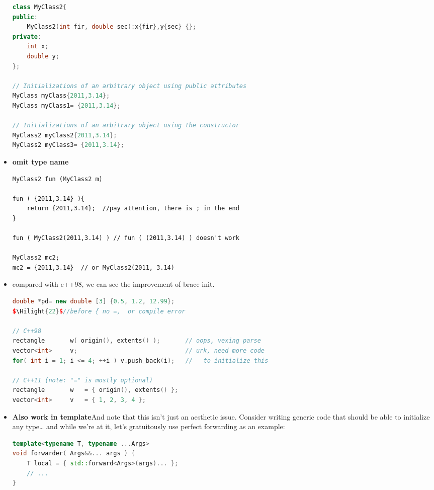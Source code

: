 \documentclass[a4paper,11pt,twoside]{book}
\newcommand{\Hilight}[1]{\makebox[0pt][l]{\color{yellow}\rule[-3pt]{#1em}{11pt}}}
\newcommand{\Hilight}[1]{}
\begin{document}
\begin{itemize}
\begin{lstlisting}[frame=single, language=c++,mathescape=true]
class MyClass2{		
public:
	MyClass2(int fir, double sec):x{fir},y{sec} {};
private: 
	int x;
	double y;
};
	
// Initializations of an arbitrary object using public attributes	
MyClass myClass{2011,3.14};      
MyClass myClass1= {2011,3.14};    
	
// Initializations of an arbitrary object using the constructor
MyClass2 myClass2{2011,3.14};     
MyClass2 myClass3= {2011,3.14};   
\end{lstlisting}
	
\item \textbf{omit type name}
	
\begin{lstlisting}
MyClass2 fun (MyClass2 m) 
	
fun ( {2011,3.14} ){
	return {2011,3.14};  //pay attention, there is ; in the end
}
	
fun ( MyClass2(2011,3.14) ) // fun ( (2011,3.14) ) doesn't work

MyClass2 mc2;
mc2 = {2011,3.14}  // or MyClass2(2011, 3.14)
	\end{lstlisting}
	
\item compared with c++98, we can see the improvement of brace init.
\begin{lstlisting}[frame=single, language=c++,mathescape=true]
double *pd= new double [3] {0.5, 1.2, 12.99}; 
$\Hilight{22}$//before { no =,  or compile error
	
// C++98 
rectangle       w( origin(), extents() );       // oops, vexing parse 
vector<int>     v;                              // urk, need more code
for( int i = 1; i <= 4; ++i ) v.push_back(i);   //   to initialize this
	
// C++11 (note: "=" is mostly optional)
rectangle       w   = { origin(), extents() }; 
vector<int>     v   = { 1, 2, 3, 4 };
\end{lstlisting}
	
\item \textbf{Also work in template}And note that this isn't just an aesthetic issue. Consider writing generic code that should be able to initialize any type… and while we're at it, let's gratuitously use perfect forwarding as an example:
	
\begin{lstlisting}[frame=single, language=c++,mathescape=true]
template<typename T, typename ...Args>
void forwarder( Args&&... args ) {
	T local = { std::forward<Args>(args)... };
	// ...
}


\end{lstlisting}
\end{itemize}
\end{document}
